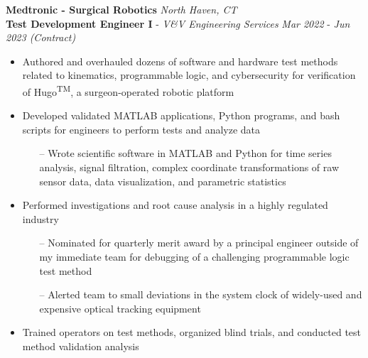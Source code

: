\documentclass{article}
\begin{document}
\vspace{3 pt} %

\noindent \textbf{Medtronic - Surgical Robotics} \hfill \textit{North Haven, CT} \\
\textbf{Test Development Engineer I} - \textit{V\&V Engineering Services} \hfill \textit{Mar 2022} - \textit{Jun 2023 (Contract)}
\begin{itemize}[noitemsep,nolistsep]
    \item{Authored and overhauled dozens of software and hardware test methods related to kinematics, programmable logic, and cybersecurity for verification of Hugo\textsuperscript{TM}, a surgeon-operated robotic platform}
    \item {Developed validated MATLAB applications, Python programs, and bash scripts for engineers to perform tests and analyze data}
\begin{itemize}[noitemsep,nolistsep]
    \item[--]{Wrote scientific software in MATLAB and Python for time series analysis, signal filtration, complex coordinate transformations of raw sensor data, data visualization, and parametric statistics}
    \begin{comment}
    \item[--]{Maintained Simulink models to command robotic arm trajectories}
    \item[--]{Automated workflows for testing PL error-handling and robustness by writing shell scripts which output files then parsed by Python scripts}
    \end{comment}
\end{itemize}
\item{Performed investigations and root cause analysis in a highly regulated industry}
\begin{itemize}[noitemsep,nolistsep]
    \item[--]{Nominated for quarterly merit award by a principal engineer outside of my immediate team for debugging of a challenging programmable logic test method}
    \item[--]{Alerted team to small deviations in the system clock of widely-used and expensive optical tracking equipment}
\end{itemize}
\item{Trained operators on test methods, organized blind trials, and conducted test method validation analysis}
\end{itemize}

\vspace{3 pt} %
\end{document}
